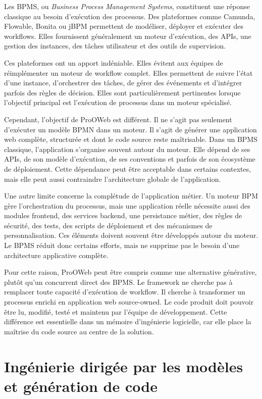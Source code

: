 \documentclass[12pt,a4paper]{article}
\begin{document}
Les BPMS, ou \textit{Business Process Management Systems}, constituent une réponse classique au besoin d'exécution des processus. Des plateformes comme Camunda, Flowable, Bonita ou jBPM permettent de modéliser, déployer et exécuter des workflows. Elles fournissent généralement un moteur d'exécution, des APIs, une gestion des instances, des tâches utilisateur et des outils de supervision.

Ces plateformes ont un apport indéniable. Elles évitent aux équipes de réimplémenter un moteur de workflow complet. Elles permettent de suivre l'état d'une instance, d'orchestrer des tâches, de gérer des événements et d'intégrer parfois des règles de décision. Elles sont particulièrement pertinentes lorsque l'objectif principal est l'exécution de processus dans un moteur spécialisé.

Cependant, l'objectif de ProOWeb est différent. Il ne s'agit pas seulement d'exécuter un modèle BPMN dans un moteur. Il s'agit de générer une application web complète, structurée et dont le code source reste maîtrisable. Dans un BPMS classique, l'application s'organise souvent autour du moteur. Elle dépend de ses APIs, de son modèle d'exécution, de ses conventions et parfois de son écosystème de déploiement. Cette dépendance peut être acceptable dans certains contextes, mais elle peut aussi contraindre l'architecture globale de l'application.

Une autre limite concerne la complétude de l'application métier. Un moteur BPM gère l'orchestration du processus, mais une application réelle nécessite aussi des modules frontend, des services backend, une persistance métier, des règles de sécurité, des tests, des scripts de déploiement et des mécanismes de personnalisation. Ces éléments doivent souvent être développés autour du moteur. Le BPMS réduit donc certains efforts, mais ne supprime pas le besoin d'une architecture applicative complète.

Pour cette raison, ProOWeb peut être compris comme une alternative générative, plutôt qu'un concurrent direct des BPMS. Le framework ne cherche pas à remplacer toute capacité d'exécution de workflow. Il cherche à transformer un processus enrichi en application web source-owned. Le code produit doit pouvoir être lu, modifié, testé et maintenu par l'équipe de développement. Cette différence est essentielle dans un mémoire d'ingénierie logicielle, car elle place la maîtrise du code source au centre de la solution.

\section{Ingénierie dirigée par les modèles et génération de code}
\end{document}
